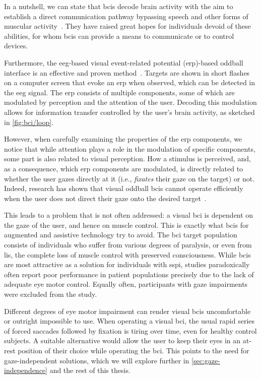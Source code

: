 In a nutshell, we can state that \acp{bci} decode brain activity with the aim to
establish a direct communication pathway bypassing speech and other forms of muscular
activity~\cite{Naci2012,Chaudhary2016}.
They have raised great hopes for individuals devoid of these abilities, for whom
\acp{bci} can provide a means to communicate or to control devices.

Furthermore, the \ac{eeg}-based visual event-related potential (\ac{erp})-based oddball
interface is an effective and proven method~\cite{Wolpaw2018,Severens2014}.
Targets are shown in short flashes on a computer screen that evoke an \ac{erp} when
observed, which can be detected in the \ac{eeg} signal.
The \ac{erp} consists of multiple components, some of which are modulated by perception
and the attention of the user.
Decoding this modulation allows for information transfer controlled by the user's brain
activity, as sketched in \cref{fig:bci/loop}.

However, when carefully examining the properties of the \ac{erp} components, we notice
that while attention plays a role in the modulation of specific components, some part is
also related to visual perception.
How a stimulus is perceived, and, as a consequence, which \ac{erp} components are
modulated, is directly related to whether the user gazes directly at it (i.e.,
\emph{fixates} their gaze on the target) or not.
Indeed, research has shown that visual oddball \ac{bci}s cannot operate efficiently when
the user does not direct their gaze onto the desired target~\cite{Brunner2010, Frenzel2011}.

This leads to a problem that is not often addressed:
a visual \ac{bci} is dependent on the gaze of the user, and hence on muscle control.
This is exactly what \acp{bci} for augmented and assistive technology try to avoid.
The \ac{bci} target population consists of individuals who suffer from various degrees
of paralysis, or even from \ac{lis}, the complete loss of muscle control with preserved
consciousness.
While \ac{bci}s are most attractive as a solution for individuals with \ac{sspi},
studies paradoxically often report poor performance in patient populations precisely due
to the lack of adequate eye motor control.
Equally often, participants with gaze impairments were excluded from the study.

Different degrees of eye motor impairment can render visual \ac{bci}s uncomfortable or
outright impossible to use.
When operating a visual \ac{bci}, the usual rapid series of forced saccades followed by
fixation is tiring over time, even for healthy control subjects.
A suitable alternative would allow the user to keep their eyes in an at-rest position of
their choice while operating the \ac{bci}.
This points to the need for gaze-independent solutions, which we will explore further in
\cref{sec:gaze-independence} and the rest of this thesis.
